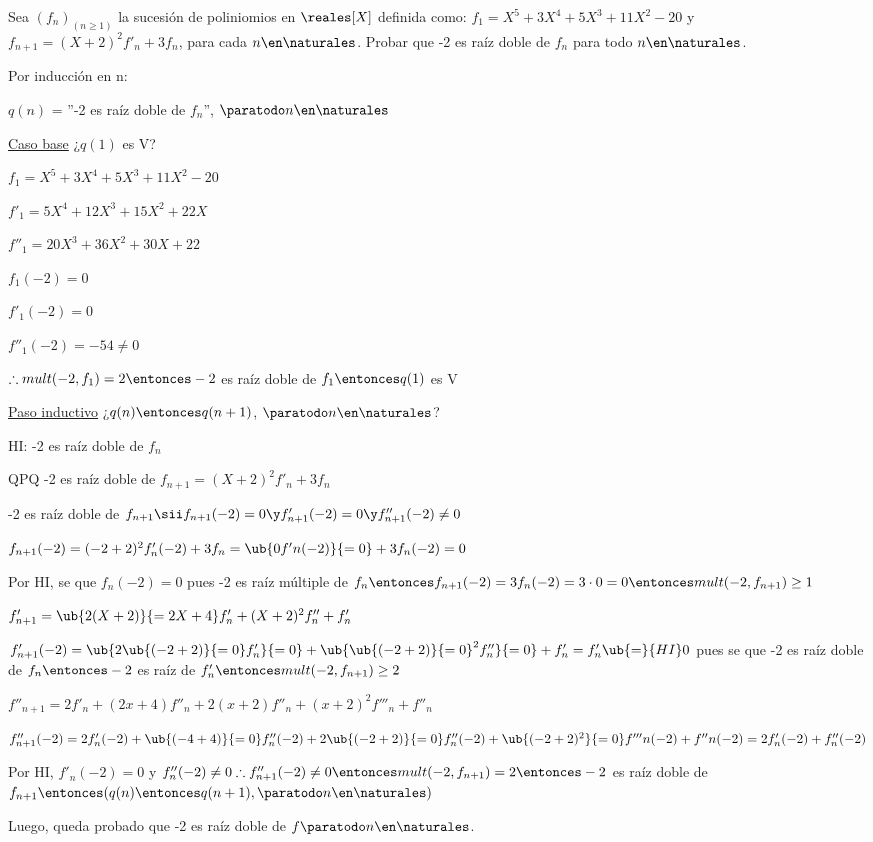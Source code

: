 \ejExtra
Sea $(f_n)_{(n\geq 1)}$ la sucesión de poliniomios en $\reales[X]$ definida como:
$f_1 = X^5 + 3X^4 + 5X^3 + 11X^2 - 20$ y $f_{n+1} = (X + 2)^2 f'_n + 3 f_n$, para cada $n \en \naturales$.
Probar que -2 es raíz doble de $f_n$ para todo $n \en \naturales$.

\separadorCorto

Por inducción en n:

$q(n)$ = ''-2 es raíz doble de $f_n$'', $\paratodo n \en \naturales$

\underline{Caso base} ¿$q(1)$ es V?

$f_1 = X^5 + 3X^4 + 5X^3 + 11X^2 - 20$

$f'_1 = 5X^4 + 12X^3 + 15X^2 + 22X$

$f''_1 = 20X^3 + 36X^2 + 30X + 22$

$f_1(-2) = 0$

$f'_1(-2) = 0$

$f''_1(-2) = -54 \neq 0$

$\therefore mult(-2, f_1) = 2 \entonces -2$ es raíz doble de $f_1 \entonces q(1)$ es V

\underline{Paso inductivo} ¿$q(n) \entonces q(n+1)$, $\paratodo n \en \naturales$?

HI: -2 es raíz doble de $f_n$

QPQ -2 es raíz doble de $f_{n+1} = (X + 2)^2 f'_n + 3f_n$

-2 es raíz doble de $f_{n+1} \sii f_{n+1}(-2) = 0 \y f'_{n+1}(-2) = 0 \y f''_{n+1}(-2) \neq 0$

$f_{n+1}(-2) = (-2+2)^2f'_n(-2)+3f_n = \ub{0f'n(-2)}{=0} + 3 f_n(-2) = 0$

Por HI, se que $f_n(-2) = 0$ pues -2 es raíz múltiple de $f_n \entonces f_{n+1}(-2) = 3f_n(-2) = 3 \cdot 0 = 0 \entonces mult(-2, f_{n+1}) \geq 1$

$f_{n+1}' = \ub{2(X+2)}{=2X+4}f'_n + (X+2)^2 f''_n + f'_n$

$f_{n+1}'(-2) = \ub{2\ub{(-2+2)}{=0}f'_n}{=0} + \ub{\ub{(-2+2)}{=0}^2f''_n}{=0} + f'_n = f'_n \ub{=}{HI} 0$ pues se que -2 es raíz doble de $f_n \entonces -2$ es raíz de $f'_n \entonces mult(-2, f_{n+1}) \geq 2$

$f''_{n+1} = 2f'_n + (2x+4)f''_n + 2(x+2) f''_n + (x+2)^2 f'''_n + f''_n$

$f''_{n+1}(-2) = 2f'_n(-2) + \ub{(-4+4)}{=0}f''_n(-2) + 2\ub{(-2+2)}{=0} f''_n(-2) + \ub{(-2+2)^2}{=0} f'''n(-2) + f''n(-2) = 2f'_n(-2) + f''_n(-2)$

Por HI, $f'_n(-2) = 0$ y $f''_n(-2) \neq 0 \therefore f_{n+1}''(-2) \neq 0 \entonces mult(-2, f_{n+1}) = 2 \entonces -2$ es raíz doble de $f_{n+1} \entonces (q(n) \entonces q(n+1), \paratodo n \en \naturales)$

Luego, queda probado que -2 es raíz doble de $f \paratodo n \en \naturales$.

